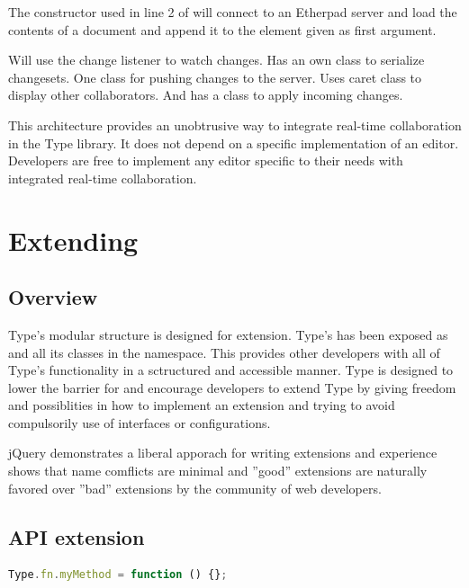 The constructor used in line 2 of  will connect to an Etherpad server and load the contents of a document and append it to the element given as first argument.

Will use the change listener to watch changes. Has an own class to serialize changesets. One class for pushing changes to the server. Uses caret class to display other collaborators. And has a class to apply incoming changes.

This architecture provides an unobtrusive way to integrate real-time collaboration in the Type library. It does not depend on a specific implementation of an editor. Developers are free to implement any editor specific to their needs with integrated real-time collaboration.




\section{Extending}
\label{sec:extensions}

\subsection{Overview}

Type's modular structure is designed for extension. Type's  has been exposed as  and all its classes in the  namespace. This provides other developers with all of Type's functionality in a sctructured and accessible manner. Type is designed to lower the barrier for and encourage developers to extend Type by giving freedom and possiblities in how to implement an extension and trying to avoid compulsorily use of interfaces or configurations.

jQuery demonstrates a liberal apporach for writing extensions and experience shows that name comflicts are minimal and ''good'' extensions are naturally favored over ''bad'' extensions by the community of web developers.

\subsection{API extension}

\begin{lstlisting}[language=JavaScript, caption=Example Type API extension, label=lst:api_extension_example]
Type.fn.myMethod = function () {};
\end{lstlisting}

